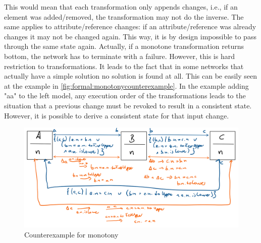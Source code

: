 This would mean that each transformation only appends changes, i.e., if an element was added/removed, the transformation may not do the inverse. The same applies to attribute/reference changes: if an attribute/reference was already changes it may not be changed again.
This way, it is by design impossible to pass through the same state again. Actually, if a monotone transformation returns bottom, the network has to terminate with a failure.
However, this is hard restriction to transformations. It leads to the fact that in some networks that actually have a simple solution no solution is found at all. This can be easily seen at the example in \autoref{fig:formal:monotonycounterexample}. In the example adding "aa" to the left model, any execution order of the transformations leads to the situation that a previous change must be revoked to result in a consistent state. However, it is possible to derive a consistent state for that input change.

\begin{figure}
    \centering
    \includegraphics[width=\textwidth]{figures/correctness/formal/monotony_counterexample.png}
    \caption{Counterexample for monotony}
    \label{fig:formal:monotonycounterexample}
\end{figure}

